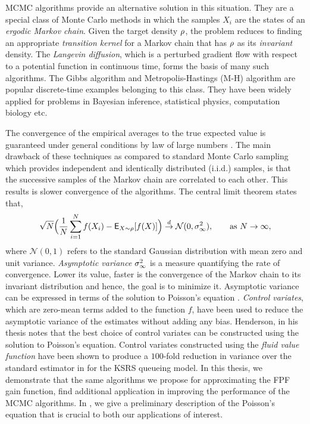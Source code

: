 MCMC algorithms provide an alternative solution in this situation. They are a special class of Monte Carlo methods in which the samples $X_i$ are the states of an \textit{ergodic Markov chain}. Given the target density $\rho$, the problem reduces to finding an appropriate \textit{transition kernel} for a Markov chain that has $\rho$ as its \textit{invariant} density. The \textit{Langevin diffusion}, which is a perturbed gradient flow with respect to a potential function in continuous time, forms the basis of many such algorithms. The Gibbs algorithm \cite{tanwon87} and Metropolis-Hastings (M-H)  algorithm \cite{has70} are popular discrete-time examples belonging to this class. They have been widely applied for problems in Bayesian inference, statistical physics, computation biology etc.

The convergence of the empirical averages to the true expected value is guaranteed under general conditions by law of large numbers \cite{}. The main drawback of these techniques as compared to standard Monte Carlo sampling which provides independent and identically distributed (i.i.d.) samples, is that the successive samples of the Markov chain are correlated to each other. This results is slower convergence of the algorithms. The central limit theorem states that,
\[
\sqrt{N} \Bigl(\frac{1}{N} \sum_{i=1}^N f(X_i) - {\sf E}_{X \sim \rho} [f(X)] \Bigr) \overset{d}{\to} \mathcal{N}(0, \sigma_\infty^2),\qquad \text{as } N \to \infty, 
\]
where $\mathcal{N}(0,1)$ refers to the standard Gaussian distribution with mean zero and unit variance. \textit{Asymptotic variance} $\sigma_\infty^2$ is a measure quantifying the rate of convergence. Lower its value, faster is the convergence of the Markov chain to its invariant distribution and hence, the goal is to minimize it. Asymptotic variance can be expressed in terms of the solution to Poisson's equation \cite{ctcn}. \textit{Control variates}, which are zero-mean terms added to the function $f$, have been used to reduce the asymptotic variance of the estimates without adding any bias. Henderson, in his thesis \cite{henthesis97} notes that the best choice of control variates can be constructed using the solution to Poisson's equation. Control variates constructed using the \textit{fluid value function} have been shown to produce a $100$-fold reduction in variance over the standard estimator in \cite{ctcn} for the KSRS queueing model. In this thesis, we demonstrate that the same algorithms we propose for approximating the FPF gain function, find additional application in improving the performance of the MCMC algorithms. In , we give a preliminary description of the Poisson's equation that is crucial to both our applications of interest.

